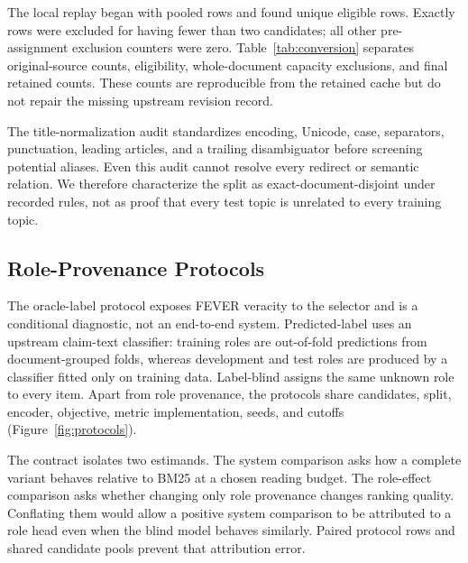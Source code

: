\documentclass[applsci,article,submit,moreauthors]{Definitions/mdpi}
\begin{document}
The local replay began with \SourceRows{} pooled rows and found \EligibleRows{} unique eligible rows. Exactly \ShortCandidateExclusions{} rows were excluded for having fewer than two candidates; all other pre-assignment exclusion counters were zero. Table~\ref{tab:conversion} separates original-source counts, eligibility, whole-document capacity exclusions, and final retained counts. These counts are reproducible from the retained cache but do not repair the missing upstream revision record.

The title-normalization audit standardizes encoding, Unicode, case, separators, punctuation, leading articles, and a trailing disambiguator before screening potential aliases. Even this audit cannot resolve every redirect or semantic relation. We therefore characterize the split as exact-document-disjoint under recorded rules, not as proof that every test topic is unrelated to every training topic.

\begin{table}[H]
\caption{Document-grouped FEVER conversion. Values are generated from the frozen dataset manifest.}\label{tab:data}
\centering
\end{table}

\begin{table}[H]
\caption{Deterministic FEVER conversion audit. The 425 eligibility exclusions all originated in the pooled source train partition; capacity exclusions are assigned after document hashing.}\label{tab:conversion}
\centering\resizebox{\textwidth}{!}{}
\end{table}

\subsection{Role-Provenance Protocols}
The oracle-label protocol exposes FEVER veracity to the selector and is a conditional diagnostic, not an end-to-end system. Predicted-label uses an upstream claim-text classifier: training roles are out-of-fold predictions from document-grouped folds, whereas development and test roles are produced by a classifier fitted only on training data. Label-blind assigns the same unknown role to every item. Apart from role provenance, the protocols share candidates, split, encoder, objective, metric implementation, seeds, and cutoffs (Figure~\ref{fig:protocols}).

The contract isolates two estimands. The system comparison asks how a complete variant behaves relative to BM25 at a chosen reading budget. The role-effect comparison asks whether changing only role provenance changes ranking quality. Conflating them would allow a positive system comparison to be attributed to a role head even when the blind model behaves similarly. Paired protocol rows and shared candidate pools prevent that attribution error.
\end{document}
